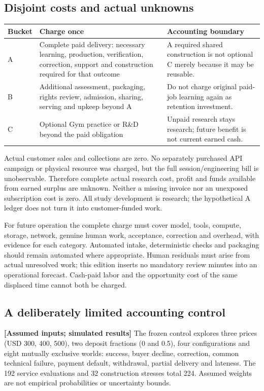\documentclass[11pt]{article}
\newcommand{\evidence}[1]{\textbf{[#1]}}
\begin{document}
\subsection{Disjoint costs and actual unknowns}
\begin{tabularx}{\textwidth}{@{}p{14mm}Y Y@{}}
\toprule
Bucket & Charge once & Accounting boundary\\\midrule
A & Complete paid delivery: necessary learning, production, verification, correction, support and construction required for that outcome & A required shared construction is not optional C merely because it may be reusable.\\
B & Additional assessment, packaging, rights review, admission, sharing, serving and upkeep beyond A & Do not charge original paid-job learning again as retention investment.\\
C & Optional Gym practice or R\&D beyond the paid obligation & Unpaid research stays research; future benefit is not current earned cash.\\
\bottomrule
\end{tabularx}

Actual customer sales and collections are zero. No separately purchased API campaign or physical resource was charged, but the full session/engineering bill is unobservable. Therefore complete actual research cost, profit and funds available from earned surplus are unknown. Neither a missing invoice nor an unexposed subscription cost is zero. All study development is research; the hypothetical A ledger does not turn it into customer-funded work.

For future operation the complete charge must cover model, tools, compute, storage, network, genuine human work, acceptance, correction and overhead, with evidence for each category. Automated intake, deterministic checks and packaging should remain automated where appropriate. Human residuals must arise from actual unresolved work; this edition inserts no mandatory review minutes into an operational forecast. Cash-paid labor and the opportunity cost of the same displaced time cannot both be charged.

\subsection{A deliberately limited accounting control}
\evidence{Assumed inputs; simulated results} The frozen control explores three prices (USD 300, 400, 500), two deposit fractions (0 and 0.5), four configurations and eight mutually exclusive worlds: success, buyer decline, correction, common technical failure, payment default, withdrawal, partial delivery and lateness. The 192 service evaluations and 32 construction stresses total 224. Assumed weights are not empirical probabilities or uncertainty bounds.
\end{document}
